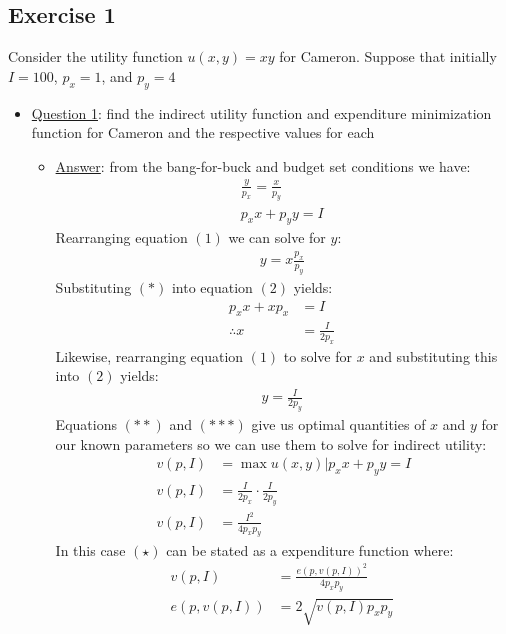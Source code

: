 \documentclass{article}
\begin{document}
\subsection{Exercise 1}
Consider the utility function $u(x,y) = xy$ for Cameron. Suppose that initially $I = 100$, $p_{x} = 1$, and $p_{y} = 4$ \par \vspace{0.3em}
\begin{itemize}
  \item  \underline{Question 1}: find the indirect utility function and expenditure minimization function for Cameron and  the respective values for each
  \begin{itemize}
    \item  \underline{Answer}: from the bang-for-buck and budget set conditions we have:
    \begin{gather*}
      \frac{y}{p_{x}} = \frac{x}{p_{y}} \ \tag{1} \\
      p_{x}x + p_{y}y = I \ \tag{2}
    \end{gather*}
    Rearranging equation $(1)$ we can solve for $y$:
    \begin{gather*}
      y = x \frac{p_{x}}{p_{y}} \ \tag{*}
    \end{gather*}
    Substituting $(*)$ into equation $(2)$ yields:
    \begin{align*}
      p_{x}x + xp_{x} &= I \\
      \therefore x &= \frac{I}{2p_{x}} \ \tag{**}
    \end{align*}
    Likewise, rearranging equation $(1)$ to solve for $x$ and substituting this into $(2)$ yields:
    \begin{gather*}
      y = \frac{I}{2p_{y}} \ \tag{***}
    \end{gather*}
    Equations $(**)$ and $(***)$ give us optimal quantities of $x$ and $y$ for our known parameters so we can use them to solve for indirect utility:
    \begin{align*}
      v(p,I) &= \max u(x,y) | p_{x}x + p_{y}y = I \\
      v(p,I) &= \frac{I}{2p_{x}} \cdot \frac{I}{2p_{y}} \\
      v(p,I) &= \frac{I^{2}}{4p_{x}p_{y}} \ \tag{$\star$}
    \end{align*}
    In this case $(\star)$ can be stated as a expenditure function where:
    \begin{align*}
      v(p,I) &= \frac{e(p,v(p,I))^{2}}{4p_{x}p_{y}} \\
      e(p,v(p,I)) &= 2 \sqrt{v(p,I)p_{x}p_{y}} \ \tag{$\star \star$}

\end{align*}
\end{itemize}
\end{itemize}
\end{document}
